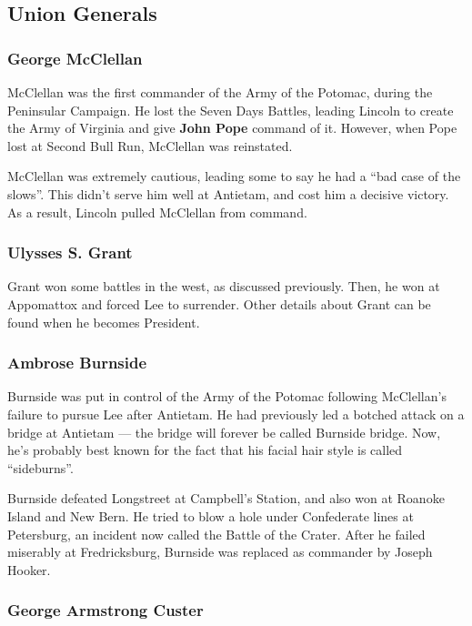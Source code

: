 \subsection*{Union Generals}

\subsubsection*{George McClellan}

McClellan was the first commander of the Army of the Potomac, during the Peninsular Campaign.
He lost the Seven Days Battles,
leading Lincoln to create the Army of Virginia and give \textbf{John Pope} command of it.
However, when Pope lost at Second Bull Run, McClellan was reinstated.

McClellan was extremely cautious, leading some to say he had a ``bad case of the slows''.
This didn't serve him well at Antietam, and cost him a decisive victory.
As a result, Lincoln pulled McClellan from command.

\subsubsection*{Ulysses S. Grant}

Grant won some battles in the west, as discussed previously.
Then, he won at Appomattox and forced Lee to surrender.
Other details about Grant can be found when he becomes President.

\subsubsection*{Ambrose Burnside}

Burnside was put in control of the Army of the Potomac following McClellan's failure to pursue Lee after Antietam.
He had previously led a botched attack on a bridge at Antietam --- the bridge will forever be called Burnside bridge.
Now, he's probably best known for the fact that his facial hair style is called ``sideburns''.

Burnside defeated Longstreet at Campbell's Station, and also won at Roanoke Island and New Bern.
He tried to blow a hole under Confederate lines at Petersburg, an incident now called the Battle of the Crater.
After he failed miserably at Fredricksburg, Burnside was replaced as commander by Joseph Hooker.


\subsubsection*{George Armstrong Custer}

